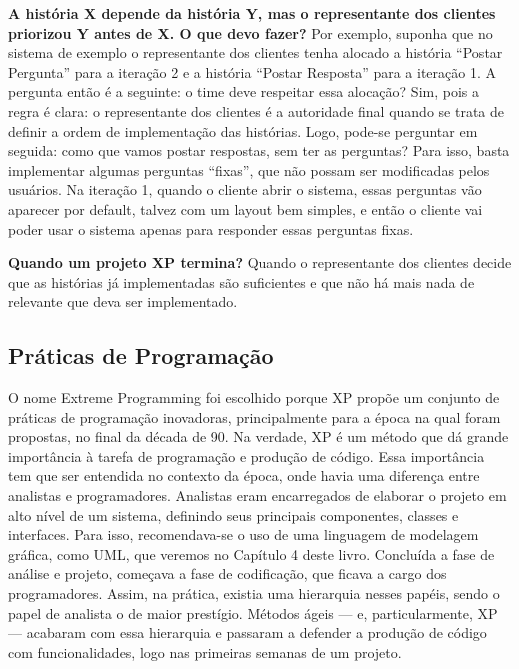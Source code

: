 \documentclass[
  11pt,
  twoside]{book}
\begin{document}
\textbf{A história X depende da história Y, mas o representante dos
clientes priorizou Y antes de X. O que devo fazer?} Por exemplo, suponha
que no sistema de exemplo o representante dos clientes tenha alocado a
história ``Postar Pergunta'' para a iteração 2 e a história ``Postar
Resposta'' para a iteração 1. A pergunta então é a seguinte: o time deve
respeitar essa alocação? Sim, pois a regra é clara: o representante dos
clientes é a autoridade final quando se trata de definir a ordem de
implementação das histórias. Logo, pode-se perguntar em seguida: como
que vamos postar respostas, sem ter as perguntas? Para isso, basta
implementar algumas perguntas ``fixas'', que não possam ser modificadas
pelos usuários. Na iteração 1, quando o cliente abrir o sistema, essas
perguntas vão aparecer por default, talvez com um layout bem simples, e
então o cliente vai poder usar o sistema apenas para responder essas
perguntas fixas.

\textbf{Quando um projeto XP termina?} Quando o representante dos
clientes decide que as histórias já implementadas são suficientes e que
não há mais nada de relevante que deva ser implementado.

\hypertarget{pruxe1ticas-de-programauxe7uxe3o}{%
\subsection{Práticas de
Programação}\label{pruxe1ticas-de-programauxe7uxe3o}}

O nome Extreme Programming foi escolhido porque XP propõe um conjunto de
práticas de programação inovadoras, principalmente para a época na qual
foram propostas, no final da década de 90. Na verdade, XP é um método
que dá grande importância à tarefa de programação e produção de código.
Essa importância tem que ser entendida no contexto da época, onde havia
uma diferença entre analistas e programadores. Analistas eram
encarregados de elaborar o projeto em alto nível de um sistema,
definindo seus principais componentes, classes e interfaces. Para isso,
recomendava-se o uso de uma linguagem de modelagem gráfica, como UML,
que veremos no Capítulo 4 deste livro. Concluída a fase de análise e
projeto, começava a fase de codificação, que ficava a cargo dos
programadores. Assim, na prática, existia uma hierarquia nesses papéis,
sendo o papel de analista o de maior prestígio. Métodos ágeis --- e,
particularmente, XP --- acabaram com essa hierarquia e passaram a
defender a produção de código com funcionalidades, logo nas primeiras
semanas de um projeto.
\end{document}
